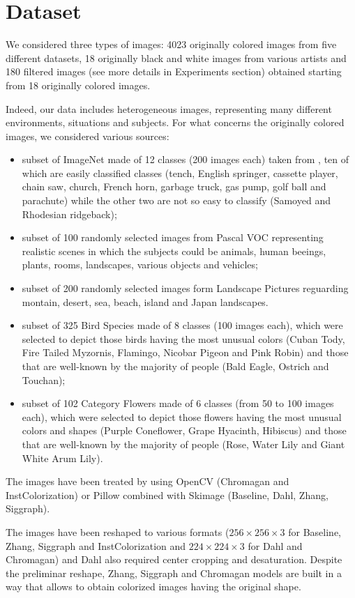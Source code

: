 \section{Dataset}
We considered three types of images: 4023 originally colored images from five different datasets, 18 originally black and white images from various artists and 180 filtered images (see more details in Experiments section) obtained starting from 18 originally colored images.

Indeed, our data includes heterogeneous images, representing many different environments, situations and subjects.
For what concerns the originally colored images, we considered various sources:
\begin{itemize}
	\item subset of ImageNet made of 12 classes (200 images each) taken from \cite{imagenette}, ten of which are easily classified classes (tench, English springer, cassette player, chain saw, church, French horn, garbage truck, gas pump, golf ball and parachute) while the other two are not so easy to classify (Samoyed and Rhodesian ridgeback);
	\item subset of 100 randomly selected images from Pascal VOC \cite{pascal} representing realistic scenes in which the subjects could be animals, human beeings, plants, rooms, landscapes, various objects and vehicles;
	\item subset of 200 randomly selected images form Landscape Pictures \cite{land} reguarding montain, desert, sea, beach, island and Japan landscapes.
	\item subset of 325 Bird Species \cite{bird} made of 8 classes (100 images each), which were selected to depict those birds having the most unusual colors (Cuban Tody, Fire Tailed Myzornis, Flamingo, Nicobar Pigeon and Pink Robin) and those that are well-known by the majority of people (Bald Eagle, Ostrich and Touchan);
	\item subset of 102 Category Flowers \cite{flower} made of 6 classes (from 50 to 100 images each), which were selected to depict those flowers having the most unusual colors and shapes (Purple Coneflower, Grape Hyacinth, Hibiscus) and those that are well-known by the majority of people (Rose, Water Lily and Giant White Arum Lily).
\end{itemize}

The images have been treated by using OpenCV (Chromagan and InstColorization) or Pillow combined with Skimage (Baseline, Dahl, Zhang, Siggraph).

The images have been reshaped to various formats ($256\times256\times3$ for Baseline, Zhang, Siggraph and InstColorization and $224\times224\times3$ for Dahl and Chromagan) and Dahl also required center cropping and desaturation. Despite the preliminar reshape, Zhang, Siggraph and Chromagan models are built in a way that allows to obtain colorized images having the original shape.

